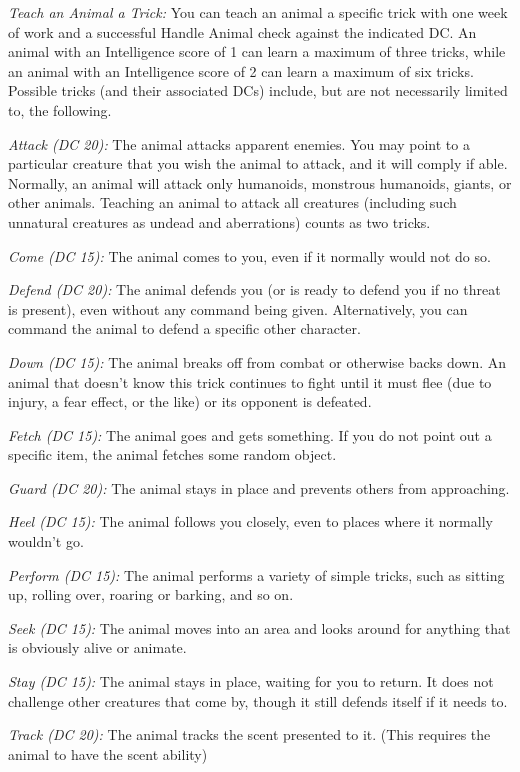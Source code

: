 \textit{Teach an Animal a Trick:} You can teach an animal a specific trick with one week of work and a successful Handle Animal check against the indicated DC. An animal with an Intelligence score of 1 can learn a maximum of three tricks, while an animal with an Intelligence score of 2 can learn a maximum of six tricks. Possible tricks (and their associated DCs) include, but are not necessarily limited to, the following.

\emph{Attack (DC 20):} The animal attacks apparent enemies. You may point to a particular creature that you wish the animal to attack, and it will comply if able. Normally, an animal will attack only humanoids, monstrous humanoids, giants, or other animals. Teaching an animal to attack all creatures (including such unnatural creatures as undead and aberrations) counts as two tricks.

\emph{Come (DC 15):} The animal comes to you, even if it normally would not do so.

\emph{Defend (DC 20):} The animal defends you (or is ready to defend you if no threat is present), even without any command being given. Alternatively, you can command the animal to defend a specific other character.

\emph{Down (DC 15):} The animal breaks off from combat or otherwise backs down. An animal that doesn't know this trick continues to fight until it must flee (due to injury, a fear effect, or the like) or its opponent is defeated.

\emph{Fetch (DC 15):} The animal goes and gets something. If you do not point out a specific item, the animal fetches some random object.

\emph{Guard (DC 20):} The animal stays in place and prevents others from approaching.

\emph{Heel (DC 15):} The animal follows you closely, even to places where it normally wouldn't go.

\emph{Perform (DC 15):} The animal performs a variety of simple tricks, such as sitting up, rolling over, roaring or barking, and so on.

\emph{Seek (DC 15):} The animal moves into an area and looks around for anything that is obviously alive or animate.

\emph{Stay (DC 15):} The animal stays in place, waiting for you to return. It does not challenge other creatures that come by, though it still defends itself if it needs to.

\emph{Track (DC 20):} The animal tracks the scent presented to it. (This requires the animal to have the scent ability)

